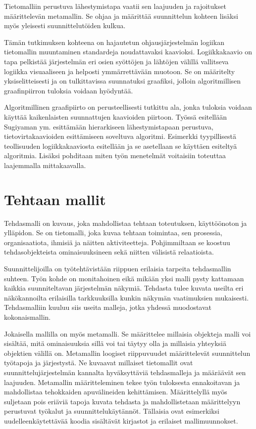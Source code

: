 \documentclass[finnish,12pt]{article}
\begin{document}
Tietomalliin perustuva lähestymistapa vaatii sen laajuuden ja rajoitukset määrittelevän metamallin.
Se ohjaa ja määrittää suunnittelun kohteen lisäksi myös yleisesti suunnittelutöiden kulkua.

Tämän tutkimuksen kohteena on hajautetun ohjausjärjestelmän logiikan tietomallin muuntaminen standardeja noudattavaksi kaavioksi.
Logiikkakaavio on tapa pelkistää järjestelmän eri osien syöttöjen ja lähtöjen välillä vallitseva logiikka visuaaliseen ja helposti ymmärrettävään muotoon.
Se on määritelty yksiselitteisesti ja on tulkittavissa suunnatuksi graafiksi, jolloin algoritmillisen graafinpiirron tuloksia voidaan hyödyntää.

Algoritmillinen graafipiirto on perusteellisesti tutkittu ala, jonka tuloksia voidaan käyttää kaikenlaisten suunnattujen kaavioiden piirtoon.
Työssä esitellään Sugiyaman ym. \cite{RefWorks:9} esittämään hierarkiseen lähestymistapaan perustuva, tietovirtakaavioiden esittämiseen soveltuva algoritmi.
Esimerkki tyypillisestä teollisuuden logiikkakaaviosta esitellään ja se asetellaan se käyttäen esiteltyä algoritmia.
Lisäksi pohditaan miten työn menetelmät voitaisiin toteuttaa laajemmalla mittakaavalla.

	\clearpage
	\section{Tehtaan mallit}

Tehdasmalli on kuvaus, joka mahdollistaa tehtaan toteutuksen, käyttöönoton ja ylläpidon.
Se on tietomalli, joka kuvaa tehtaan toimintaa, sen prosessia, organisaatiota, ihmisiä ja näitten aktiviteetteja.
Pohjimmiltaan se koostuu tehdasobjekteista ominaisuuksineen sekä niitten välisistä relaatioista. \cite{RefWorks:41}

Suunnittelijoilla on työtehtävistään riippuen erilaisia tarpeita tehdasmallin suhteen.
Työn kohde on monitahoinen eikä mikään yksi malli pysty kattamaan kaikkia suunniteltavan järjestelmän näkymiä.
Tehdasta tulee kuvata useilta eri näkökannoilta erilaisilla tarkkuuksilla kunkin näkymän vaatimuksien mukaisesti.
Tehdasmalliin kuuluu siis useita malleja, jotka yhdessä muodostavat kokonaismallin.

Jokaisella mallilla on myös metamalli. Se määrittelee millaisia objekteja malli voi sisältää, mitä ominaisuuksia sillä voi tai täytyy olla ja millaisia yhteyksiä objektien välillä on.
Metamallin loogiset riippuvuudet määrittelevät suunnittelun työtapoja ja järjestystä.
Ne kuvaavat millaiset tietomallit ovat suunnittelujärjestelmän kannalta hyväksyttäviä tehdasmalleja ja
määräävät sen laajuuden. Metamallin määritteleminen tekee työn tuloksesta ennakoitavan ja mahdollistaa tehokkaiden apuvälineiden kehittämisen.
Määrittelyllä myös suljetaan pois eriäviä tapoja kuvata tehdasta ja mahdollistetaan määrittelyyn perustuvat työkalut ja suunnittelukäytännöt.
Tällaisia ovat esimerkiksi uudelleenkäytettävää koodia sisältävät kirjastot ja erilaiset mallimuunnokset.
\end{document}
